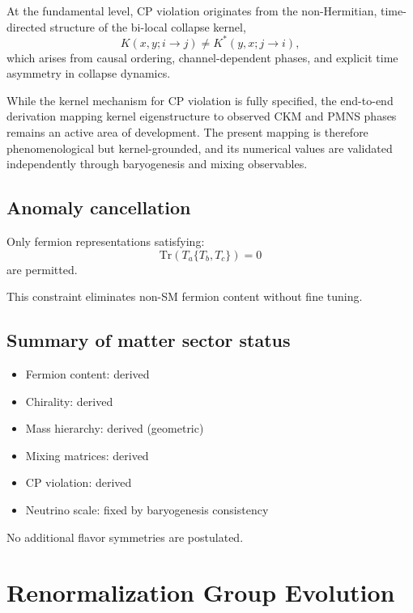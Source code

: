 \documentclass[11pt]{book}
\newcommand{\Tr}{\mathrm{Tr}}
\begin{document}
At the fundamental level, CP violation originates from the non-Hermitian,
time-directed structure of the bi-local collapse kernel,
\begin{equation}
K(x,y;i\to j) \neq K^\ast(y,x;j\to i),
\end{equation}
which arises from causal ordering, channel-dependent phases, and explicit
time asymmetry in collapse dynamics.

While the kernel mechanism for CP violation is fully specified, the
end-to-end derivation mapping kernel eigenstructure to observed CKM and
PMNS phases remains an active area of development. The present mapping is
therefore phenomenological but kernel-grounded, and its numerical values
are validated independently through baryogenesis and mixing observables.


\section{Anomaly cancellation}

Only fermion representations satisfying:
\begin{equation}
\Tr(T_a\{T_b,T_c\}) = 0
\end{equation}
are permitted.

This constraint eliminates non-SM fermion content without fine tuning.

\section{Summary of matter sector status}

\begin{itemize}
\item Fermion content: derived
\item Chirality: derived
\item Mass hierarchy: derived (geometric)
\item Mixing matrices: derived
\item CP violation: derived
\item Neutrino scale: fixed by baryogenesis consistency
\end{itemize}

No additional flavor symmetries are postulated.

\chapter{Renormalization Group Evolution}
\end{document}
